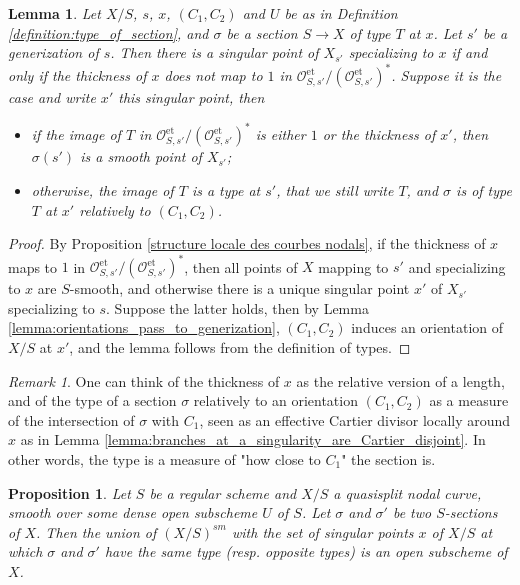 \documentclass[a4paper,10pt,twoside]{article}
\newcommand{\on}[1]{\operatorname{#1}}
\renewcommand{\O}{\mathcal{O}}
\newtheorem{lem}[thm]{Lemma}
\newtheorem{prop}[thm]{Proposition}
\theoremstyle{definition}
\theoremstyle{remark}
\newtheorem{rem}{Remark}[thm]
\renewcommand{\on}[1]{\operatorname{#1}}
\begin{document}
\begin{lem}\label{lemma:type_passes_to_generization}
Let $X/S$, $s$, $x$, $(C_1,C_2)$ and $U$ be as in Definition \ref{definition:type_of_section}, and $\sigma$ be a section $S\to X$ of type $T$ at $x$. Let $s'$ be a generization of $s$. Then there is a singular point of $X_{s'}$ specializing to $x$ if and only if the thickness of $x$ does not map to $1$ in $\O_{S,s'}^{\on{et}}/(\O_{S,s'}^{\on{et}})^*$. Suppose it is the case and write $x'$ this singular point, then
\begin{itemize}
\item if the image of $T$ in $\O_{S,s'}^{\on{et}}/(\O_{S,s'}^{\on{et}})^*$ is either $1$ or the thickness of $x'$, then $\sigma(s')$ is a smooth point of $X_{s'}$;
\item otherwise, the image of $T$ is a type at $s'$, that we still write $T$, and $\sigma$ is of type $T$ at $x'$ relatively to $(C_1,C_2)$.
\end{itemize}
\end{lem}

\begin{proof}
By Proposition \ref{structure locale des courbes nodals}, if the thickness of $x$ maps to $1$ in $\O_{S,s'}^{\on{et}}/(\O_{S,s'}^{\on{et}})^*$, then all points of $X$ mapping to $s'$ and specializing to $x$ are $S$-smooth, and otherwise there is a unique singular point $x'$ of $X_{s'}$ specializing to $s$. Suppose the latter holds, then by Lemma \ref{lemma:orientations_pass_to_generization}, $(C_1,C_2)$ induces an orientation of $X/S$ at $x'$, and the lemma follows from the definition of types.
\end{proof}

\begin{rem}
One can think of the thickness of $x$ as the relative version of a length, and of the type of a section $\sigma$ relatively to an orientation $(C_1,C_2)$ as a measure of the intersection of $\sigma$ with $C_1$, seen as an effective Cartier divisor locally around $x$ as in Lemma \ref{lemma:branches_at_a_singularity_are_Cartier_disjoint}. In other words, the type is a measure of "how close to $C_1$" the section is.
\end{rem}

\begin{prop}\label{proposition:locus_of_same_type_is_open}
Let $S$ be a regular scheme and $X/S$ a quasisplit nodal curve, smooth over some dense open subscheme $U$ of $S$. Let $\sigma$ and $\sigma'$ be two $S$-sections of $X$. Then the union of $(X/S)^{sm}$ with the set of singular points $x$ of $X/S$ at which $\sigma$ and $\sigma'$ have the same type (resp. opposite types) is an open subscheme of $X$.
\end{prop}
\end{document}
